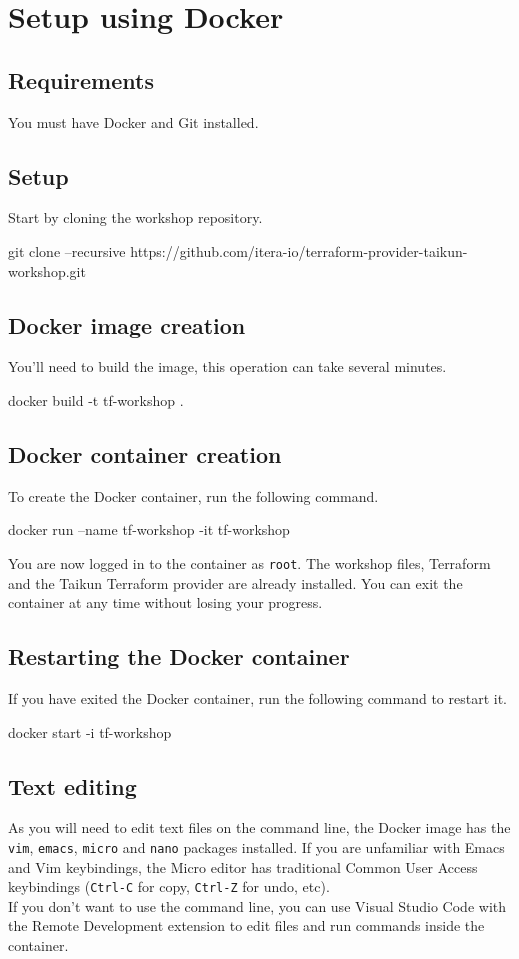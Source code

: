 \section{Setup using Docker}\label{sec:docker}

\subsection{Requirements}
You must have Docker and Git installed.

\subsection{Setup}
Start by cloning the workshop repository.
\begin{shell}
git clone --recursive https://github.com/itera-io/terraform-provider-taikun-workshop.git
\end{shell}

\subsection{Docker image creation}
You'll need to build the image, this operation can take several minutes.
\begin{shell}
docker build -t tf-workshop .
\end{shell}

\subsection{Docker container creation}
To create the Docker container, run the following command.
\begin{shell}
docker run --name tf-workshop -it tf-workshop
\end{shell}
You are now logged in to the container as \texttt{root}. The workshop files,
Terraform and the Taikun Terraform provider are already installed.
You can exit the container at any time without losing your progress.

\subsection{Restarting the Docker container}
If you have exited the Docker container, run the following command to restart it.
\begin{shell}
docker start -i tf-workshop
\end{shell}

\subsection{Text editing}
As you will need to edit text files on the command line,
the Docker image has the \texttt{vim},
\texttt{emacs}, \texttt{micro} and \texttt{nano} packages installed.
If you are unfamiliar with Emacs and Vim keybindings, the Micro editor
has traditional Common User Access keybindings (\texttt{Ctrl-C} for copy,
\texttt{Ctrl-Z} for undo, etc).\\

If you don't want to use the command line, you can use Visual Studio Code with
the Remote Development extension to edit files and run commands inside the
container.
